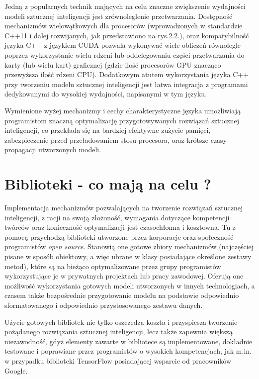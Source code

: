 Jedną z popularnych technik mających na celu znaczne zwiększenie wydajności modeli sztucznej inteligencji jest zrównoleglenie przetwarzania. Dostępność mechanizmów wielowątkowych dla procesorów (wprowadzonych w standardzie C++11 i dalej rozwijanych, jak przedstawiono na rys.2.2.), oraz kompatybilność języka C++ z językiem CUDA pozwala wykonywać wiele obliczeń równolegle poprzez wykorzystanie wielu rdzeni lub oddelegowaniu części przetwarzania do karty (lub wielu kart) graficznej (gdzie ilość procesorów GPU znacząco przewyższa ilość rdzeni CPU). Dodatkowym atutem wykorzystania języka C++ przy tworzeniu modelu sztucznej inteligencji jest łatwa integracja z programami dedykowanymi do wysokiej wydajności, napisanymi w tym języku.

Wymienione wyżej mechanizmy i cechy charakterystyczne języka umożliwiają programistom znaczną optymalizację przygotowywanych rozwiązań sztucznej inteligencji, co przekłada się na bardziej efektywne zużycie pamięci, zabezpieczenie przed przeładowaniem stosu procesora, oraz krótsze czasy propagacji utworzonych modeli.

\section{Biblioteki - co mają na celu ?}

Implementacja mechanizmów pozwalających na tworzenie rozwiązań sztucznej inteligencji, z racji na swoją złożoność, wymagania dotyczące kompetencji twórców  oraz konieczność optymalizacji jest czasochłonna i kosztowna. Tu z pomocą przychodzą biblioteki utworzone przez korporacje oraz społeczność programistów \textit{open source}. Stanowią one gotowe zbiory mechanizmów (najczęściej pisane w sposób obiektowy, a więc ubrane w klasy posiadające określone zestawy metod), które są na bieżąco optymalizowane przez grupy programistów wykorzystujące je w prywatnych projektach lub pracy zawodowej. Oferują one możliwość wykorzystania gotowych modeli utworzonych w innych technologiach, a czasem także bezpośrednie przygotowanie modelu na podstawie odpowiednio sformatowanego i odpowiednio przystosowanego zestawu danych.

Użycie gotowych bibliotek nie tylko oszczędza koszta i przyspiesza tworzenie pożądanego rozwiązania sztucznej inteligencji, lecz także zapewnia większą niezawodność, gdyż elementy zawarte w bibliotece są implementowane, dokładnie testowane i poprawiane przez programistów o wysokich kompetencjach, jak m.in. w przypadku biblioteki TensorFlow posiadającej wsparcie od pracowników Google.

